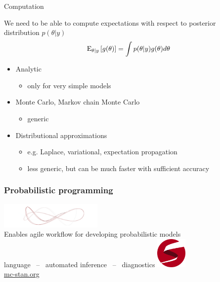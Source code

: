 \documentclass[10pt,handout]{beamer}
\begin{document}
\begin{frame}{Computation}

  We need to be able to compute expectations with respect to posterior
  distribution $p(\theta|y)$
  \begin{align*}
    \mathrm{E}_{\theta|y}\left[ g(\theta) \right] = \int p(\theta|y)g(\theta) d\theta
  \end{align*}

  \begin{itemize}
  \item Analytic
    \begin{itemize}
    \item only for very simple models
    \end{itemize}
  \item Monte Carlo, Markov chain Monte Carlo
    \begin{itemize}
    \item generic
    \end{itemize}
  \item Distributional approximations
    \begin{itemize}
    \item e.g. Laplace, variational, expectation propagation
    \item less generic, but can be much faster with sufficient accuracy
    \end{itemize}
  \end{itemize}
\end{frame}

\begin{frame}

  \frametitle{Probabilistic programming}

  \begin{center}
   \vspace{-\baselineskip}
    \includegraphics[width=5cm]{figs/wide_ensemble.png}\\
   \vspace{2\baselineskip}
  {\large Enables agile workflow for developing probabilistic models}\\
   \vspace{\baselineskip}
   language \, -- \,
   automated inference \, -- \,
   diagnostics
   \vspace{\baselineskip}
  \vfill
    \includegraphics[width=1.5cm]{figs/stan_logo_wide.png}\\
    \url{mc-stan.org}
  \end{center}

\end{frame}
\end{document}
